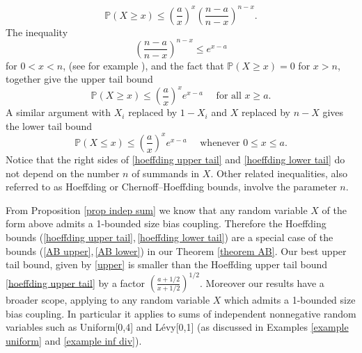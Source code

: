 \documentclass[smallextended,envcountsect]{svjour3}
\begin{document}
    $$\mathbb{P}(X \ge x) \le \left(\frac{a}{x}\right)^x \left(\frac{n-a}{n-x}\right)^{n-x}.
    $$
The inequality
     $$
     \left(\frac{n-a}{n-x}\right)^{n-x} \le e^{x-a}
     $$
for $0 < x < n$, (see for example \cite{hagerup}), and the fact that $\mathbb{P}(X \ge x) = 0$ for $x > n$, together give the upper tail bound
    \begin{equation} \label{hoeffding upper tail}
    \mathbb{P}(X \ge x) \le \left(\frac{a}{x}\right)^x e^{x-a} \quad \mbox{ for all } x \ge a.
    \end{equation}
A similar argument with $X_i$ replaced by $1-X_i$ and $X$ replaced by $n-X$ gives the lower tail bound
    \begin{equation} \label{hoeffding lower tail}
    \mathbb{P}(X \le x) \le \left(\frac{a}{x}\right)^x e^{x-a} \quad \mbox{ whenever } 0 \le x \le a.
    \end{equation}
Notice that the right sides of \eqref{hoeffding upper tail} and \eqref{hoeffding lower tail} do not depend on the number $n$ of summands in $X$.  Other related inequalities, also referred to as Hoeffding or Chernoff--Hoeffding bounds, involve the parameter $n$.

From Proposition \ref{prop indep sum} we know that any random variable $X$ of the form above admits a 1-bounded size bias coupling.  Therefore the Hoeffding bounds (\ref{hoeffding upper tail},\,\ref{hoeffding lower tail}) are a special case of the bounds (\ref{AB upper},\,\ref{AB lower}) in our Theorem \ref{theorem AB}.  Our best upper tail bound, given by \eqref{upper} is smaller than the Hoeffding upper tail bound \eqref{hoeffding upper tail} by a factor $\displaystyle{\left(\frac{a+1/2}{x+1/2}\right)^{1/2}}$.  Moreover our results have a broader scope, applying to any random variable $X$ which admits a 1-bounded size bias coupling.  In particular it applies to sums of independent nonnegative random variables such as Uniform[0,4] and L\'evy[0,1] (as discussed in Examples \ref{example uniform} and \ref{example inf div}).

      
   
\end{document}
